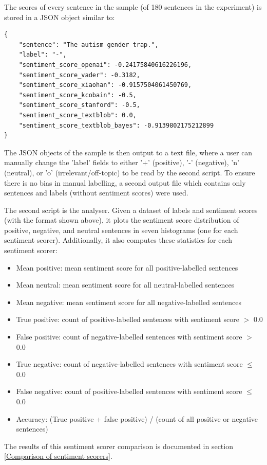 \documentclass{report}
\begin{document}
The scores of every sentence in the sample (of 180 sentences in the experiment) is stored in a JSON object similar to:
\begin{lstlisting}
{
	"sentence": "The autism gender trap.",
	"label": "-",
	"sentiment_score_openai": -0.24175840616226196,
	"sentiment_score_vader": -0.3182,
	"sentiment_score_xiaohan": -0.9157504061450769,
	"sentiment_score_kcobain": -0.5,
	"sentiment_score_stanford": -0.5,
	"sentiment_score_textblob": 0.0,
	"sentiment_score_textblob_bayes": -0.9139802175212899
}
\end{lstlisting}
The JSON objects of the sample is then output to a text file, where a user can manually change the 'label' fields to either '+' (positive), '-' (negative), 'n' (neutral), or 'o' (irrelevant/off-topic) to be read by the second script.
To ensure there is no bias in manual labelling, a second output file which contains only sentences and labels (without sentiment scores) were used.

The second script is the analyser.
Given a dataset of labels and sentiment scores (with the format shown above), it plots the sentiment score distribution of positive, negative, and neutral sentences in seven histograms (one for each sentiment scorer).
Additionally, it also computes these statistics for each sentiment scorer:
\begin{itemize}
	\item Mean positive: mean sentiment score for all positive-labelled sentences
	\item Mean neutral: mean sentiment score for all neutral-labelled sentences
	\item Mean negative: mean sentiment score for all negative-labelled sentences
	\item True positive: count of positive-labelled sentences with sentiment score $>$ 0.0
	\item False positive: count of negative-labelled sentences with sentiment score $>$ 0.0 
	\item True negative: count of negative-labelled sentences with sentiment score $\le$ 0.0
	\item False negative: count of positive-labelled sentences with sentiment score $\le$ 0.0
	\item Accuracy: (True positive + false positive) / (count of all positive or negative sentences)
\end{itemize}
The results of this sentiment scorer comparison is documented in section \ref{Comparison of sentiment scorers}.
\end{document}
